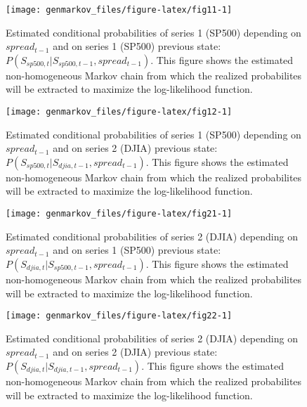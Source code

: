 \begin{figure}

{\centering \texttt{[image: genmarkov\_files/figure-latex/fig11-1]} 

}

\caption{Estimated conditional probabilities of series 1 (SP500) depending on $spread_{t-1}$ and on series 1 (SP500) previous state: $P(S_{sp500,t} | S_{sp500, t-1}, spread_{t-1})$. This figure shows the estimated non-homogeneous Markov chain from which the realized probabilites will be extracted to maximize the log-likelihood function.}\label{fig:fig11}
\end{figure}

\begin{figure}

{\centering \texttt{[image: genmarkov\_files/figure-latex/fig12-1]} 

}

\caption{Estimated conditional probabilities of series 1 (SP500) depending on $spread_{t-1}$ and on series 2 (DJIA) previous state: $P(S_{sp500,t} | S_{djia, t-1}, spread_{t-1})$. This figure shows the estimated non-homogeneous Markov chain from which the realized probabilites will be extracted to maximize the log-likelihood function.}\label{fig:fig12}
\end{figure}

\begin{figure}

{\centering \texttt{[image: genmarkov\_files/figure-latex/fig21-1]} 

}

\caption{Estimated conditional probabilities of series 2 (DJIA) depending on $spread_{t-1}$ and on series 1 (SP500) previous state: $P(S_{djia,t} | S_{sp500, t-1}, spread_{t-1})$. This figure shows the estimated non-homogeneous Markov chain from which the realized probabilites will be extracted to maximize the log-likelihood function.}\label{fig:fig21}
\end{figure}

\begin{figure}

{\centering \texttt{[image: genmarkov\_files/figure-latex/fig22-1]} 

}

\caption{Estimated conditional probabilities of series 2 (DJIA) depending on $spread_{t-1}$ and on series 2 (DJIA) previous state: $P(S_{djia,t} | S_{djia, t-1}, spread_{t-1})$. This figure shows the estimated non-homogeneous Markov chain from which the realized probabilites will be extracted to maximize the log-likelihood function.}\label{fig:fig22}
\end{figure}

